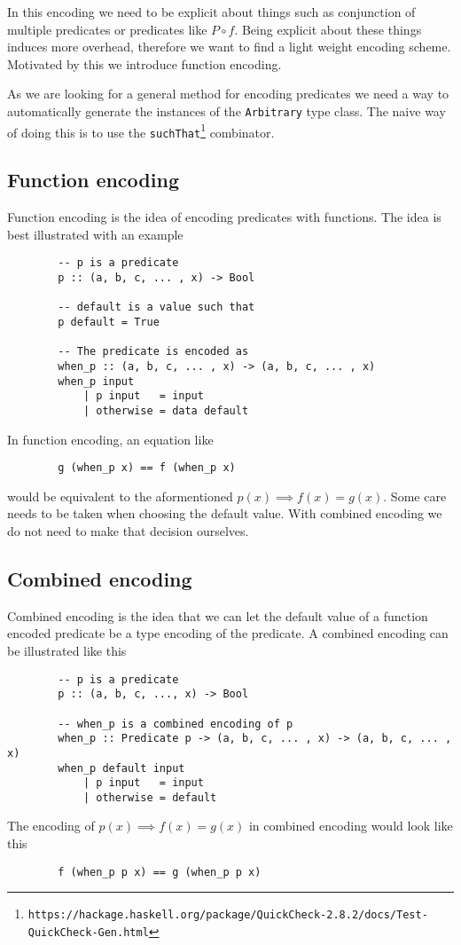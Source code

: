         In this encoding we need to be explicit about things such as conjunction
        of multiple predicates or predicates like $P\circ f$.
        Being explicit about these things induces more overhead, therefore
        we want to find a light weight encoding scheme. Motivated by this
        we introduce function encoding.

        As we are looking for a general method for encoding predicates we need
        a way to automatically generate the instances of the \texttt{Arbitrary} type class.
        The naive way of doing this is to use the
        \texttt{suchThat}\footnote{\texttt{https://hackage.haskell.org/package/QuickCheck-2.8.2/docs/Test-QuickCheck-Gen.html}} 
        combinator. 

    \subsection{Function encoding}

        Function encoding is the idea of encoding 
        predicates with functions. The idea is best
        illustrated with an example
        \begin{verbatim}
        -- p is a predicate
        p :: (a, b, c, ... , x) -> Bool

        -- default is a value such that
        p default = True

        -- The predicate is encoded as
        when_p :: (a, b, c, ... , x) -> (a, b, c, ... , x)
        when_p input
            | p input   = input
            | otherwise = data default
        \end{verbatim}
        In function encoding, an equation like
        \begin{verbatim}
        g (when_p x) == f (when_p x)
        \end{verbatim}
        would be equivalent to the aformentioned $p(x) \implies f(x) = g(x)$.
        Some care needs to be taken when choosing the default value.
        With combined encoding we do not need to make that decision ourselves.

     \subsection{Combined encoding}\label{combined_encoding}
        
        Combined encoding is the idea that we can let the
        default value of a function encoded predicate be a type
        encoding of the predicate. A combined encoding can be illustrated
        like this
        \begin{verbatim}
        -- p is a predicate
        p :: (a, b, c, ..., x) -> Bool  

        -- when_p is a combined encoding of p
        when_p :: Predicate p -> (a, b, c, ... , x) -> (a, b, c, ... , x)
        when_p default input
            | p input   = input
            | otherwise = default
        \end{verbatim}
        The encoding of $p(x) \implies f(x) = g(x)$ in combined encoding would look like
        this
        \begin{verbatim}
        f (when_p p x) == g (when_p p x)
        \end{verbatim}

